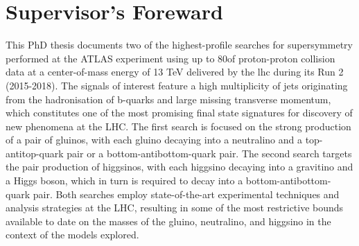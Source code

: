 \chapter*{Supervisor's Foreward}


This PhD thesis documents two of the highest-profile searches for supersymmetry performed at the ATLAS experiment using up to 80\ifb of proton-proton collision data at a center-of-mass energy of 13 TeV delivered by the \gls{lhc} during its Run 2 (2015-2018). 
The signals of interest feature a high multiplicity of jets originating from the hadronisation of b-quarks and large missing transverse momentum, 
which constitutes one of the most promising final state signatures for discovery of new phenomena at the LHC. 
The first search is focused on the strong production of a pair of gluinos, 
with each gluino decaying into a neutralino and a top-antitop-quark pair or a bottom-antibottom-quark pair. 
The second search targets the pair production of higgsinos, 
with each higgsino decaying into a gravitino and a Higgs boson, 
which in turn is required to decay into a bottom-antibottom-quark pair. 
Both searches employ state-of-the-art experimental techniques and analysis strategies at the LHC, 
resulting in some of the most restrictive bounds available to date on the masses of the gluino, 
neutralino, 
and higgsino in the context of the models explored.
